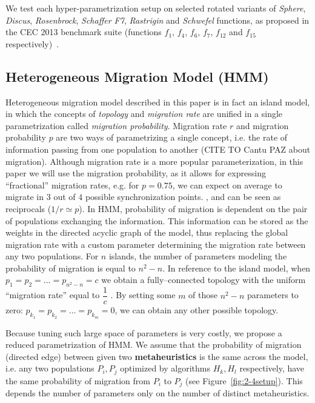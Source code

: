 \documentclass{sig-alternate}
\begin{document}
We test each hyper-parametrization setup on selected rotated variants of \emph{Sphere}, \emph{Discus}, \emph{Rosenbrock}, \emph{Schaffer F7}, \emph{Rastrigin} and \emph{Schwefel} functions, as proposed in the CEC 2013 benchmark suite (functions $f_1$, $f_4$, $f_6$, $f_7$, $f_{12}$ and $f_{15}$ respectively)~\cite{liang2013problem}.

\subsection{Heterogeneous Migration Model (HMM)}
Heterogeneous migration model described in this paper is in fact an island model, in which the concepts of \emph{topology} and \emph{migration rate} are unified in a single parametrization called \emph{migration probability}.
Migration rate $r$ and migration probability $p$ are two ways of parametrizing a single concept, i.e. the rate of information passing from one population to another (CITE TO Cantu PAZ about migration).
Although migration rate is a more popular parameterization, in this paper we will use the migration probability, as it allows for expressing ``fractional'' migration rates, e.g. for $p=0.75$, we can expect on average to migrate in $3$ out of $4$ possible synchronization points.
, and can be seen as reciprocals ($ 1/r \simeq p$).
In HMM, probability of migration is dependent on the pair of populations exchanging the information.
This information can be stored as the weights in the directed acyclic graph of the model, thus replacing the global migration rate with a custom parameter determining the migration rate between any two populations.
For $n$ islands, the number of parameters modeling the probability of migration is equal to $n^2 - n$.
In reference to the island model, when $p_1=p_2=\ldots=p_{n^2-n}=c$ we obtain a fully--connected topology with the uniform ``migration rate'' equal to $\dfrac{1}{c}$ .
By setting some $m$ of those $n^2-n$ parameters to zero: $p_{k_1} = p_{k_2} = \ldots = p_{k_m} = 0$, we can obtain any other possible topology.

Because tuning such large space of parameters is very costly, we propose a reduced parametrization of HMM.
We assume that the probability of migration (directed edge) between given two \textbf{metaheuristics} is the same across the model, i.e. any two populations $P_i, P_j$ optimized by algorithms $H_k, H_l$ respectively, have the same probability of migration from $P_i$ to $P_j$ (see Figure~\ref{fig:2-4setup}).
This depends the number of parameters only on the number of distinct metaheuristics.
\end{document}
